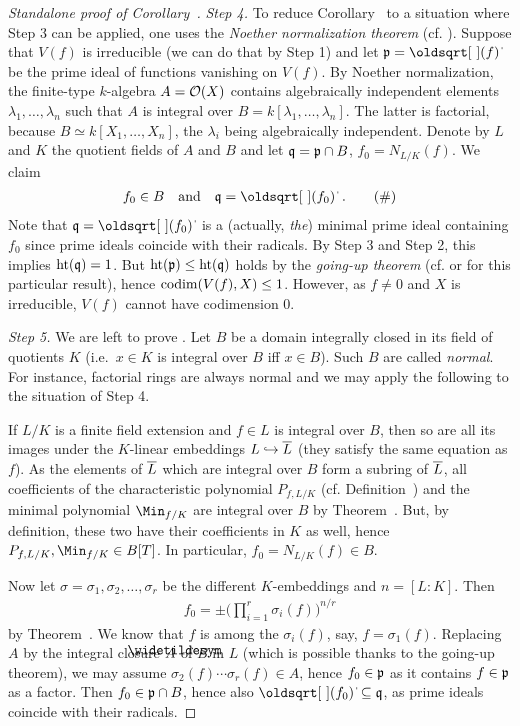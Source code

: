 \documentclass[a4paper,parskip=half,numbers=enddot, DIV=12, headheight=30pt]{scrreprt}
\begin{document}
\begin{proof}[Standalone proof of Corollary~]
	\emph{Step 4.} To reduce Corollary~ to a situation where Step 3 can be applied, one uses the \emph{Noether normalization theorem} (cf. \cite[Theorem~3]{alg1}). Suppose that $V(f)$ is irreducible (we can do that by Step 1) and let $\pp=\sqrt{(f)}$ be the prime ideal of functions vanishing on $V(f)$. By Noether normalization, the finite-type $k$-algebra $A=\mathcal{O}(X)$ contains algebraically independent elements $\lambda_1,\ldots,\lambda_n$ such that $A$ is integral over $B=k[\lambda_1,\ldots,\lambda_n]$. The latter is factorial, because $B\simeq k[X_1,\ldots,X_n]$, the $\lambda_i$ being algebraically independent. Denote by $L$ and $K$ the quotient fields of $A$ and $B$ and let $\mathfrak{q}=\mathfrak{p}\cap B$, $f_0=N_{L/K}(f)$. We claim
	\begin{align}\lbl{eq:GoingUp2Bapplied}
		f_0\in B\quad\text{and}\quad \qq=\sqrt{(f_0)}\;.\tag{\#}
	\end{align}
	Note that $\qq=\sqrt{(f_0)}$ is a (actually, \emph{the}) minimal prime ideal containing $f_0$ since prime ideals coincide with their radicals. By Step 3 and Step 2, this implies $\operatorname{ht}(\mathfrak{q})=1$. But $\operatorname{ht}(\mathfrak{p})\leq\operatorname{ht}(\mathfrak{q})$ holds by the \emph{going-up theorem} (cf. \cite[Theorem~7]{alg1} or \cite[Fact~2.6.2]{alg1} for this particular result), hence $\operatorname{codim}(V(f), X)\leq 1$. However, as $f\not=0$ and $X$ is irreducible, $V(f)$ cannot have codimension 0. 
	
	\emph{Step 5.} We are left to prove . Let $B$ be a domain integrally closed in its field of quotients $K$ (i.e.\ $x\in K$ is integral over $B$ iff $x\in B$). Such $B$ are called \emph{normal}. For instance, factorial rings are always normal and we may apply the following to the situation of Step 4. 
	
	If $L/K$ is a finite field extension and $f\in L$ is integral over $B$, then so are all its images under the $K$-linear embeddings $L\hookrightarrow \overline L$ (they satisfy the same equation as $f$). As the elements of $\overline L$ which are integral over $B$ form a subring of $\overline L$, all coefficients of the characteristic polynomial $P_{f,L/K}$ (cf. Definition~) and the minimal polynomial $\Min_{f/K}$ are integral over $B$ by Theorem~. But, by definition, these two have their coefficients in $K$ as well, hence $P_{f,L/K},\Min_{f/K}\in B[T]$. In particular, $f_0=N_{L/K}(f)\in B$.
	
	Now let $\sigma=\sigma_1,\sigma_2,\ldots,\sigma_r$ be the different $K$-embeddings and $n=[L:K]$. Then 
	\begin{align*}
		f_0=\pm \bigg(\prod_{i=1}^{r}\sigma_i(f)\bigg)^{n/r}
	\end{align*}
	by Theorem~. We know that $f$ is among the $\sigma_i(f)$, say, $f=\sigma_1(f)$. Replacing $A$ by the integral closure $\snake A$ of $B$ in $L$ (which is possible thanks to the going-up theorem), we may assume $\sigma_2(f)\cdots\sigma_r(f)\in A$, hence $f_0\in \mathfrak{p}$ as it contains $f\in\mathfrak{p}$ as a factor. Then $f_0\in\mathfrak{p}\cap B$, hence also $\sqrt{(f_0)}\subseteq\qq$, as prime ideals coincide with their radicals. 
	

\end{proof}
\end{document}
